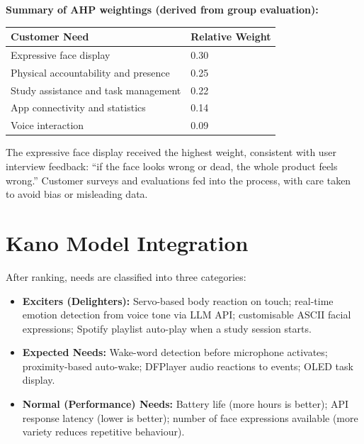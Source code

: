 \documentclass[12pt,a4paper]{article}
\begin{document}
\textbf{Summary of AHP weightings (derived from group evaluation):}

\begin{center}
\begin{tabular}{|L{0.45\textwidth}|L{0.20\textwidth}|}
\hline
\textbf{Customer Need} & \textbf{Relative Weight} \\ \hline
Expressive face display & 0.30 \\ \hline
Physical accountability and presence & 0.25 \\ \hline
Study assistance and task management & 0.22 \\ \hline
App connectivity and statistics & 0.14 \\ \hline
Voice interaction & 0.09 \\ \hline
\end{tabular}
\end{center}

The expressive face display received the highest weight, consistent with user interview
feedback: ``if the face looks wrong or dead, the whole product feels wrong.''
Customer surveys and evaluations fed into the process, with care taken to avoid bias
or misleading data.

\section*{Kano Model Integration}

After ranking, needs are classified into three categories:

\begin{itemize}[leftmargin=*]
\item \textbf{Exciters (Delighters):} Servo-based body reaction on touch;
      real-time emotion detection from voice tone via LLM API; customisable
      ASCII facial expressions; Spotify playlist auto-play when a study
      session starts.
\item \textbf{Expected Needs:} Wake-word detection before microphone activates;
      proximity-based auto-wake; DFPlayer audio reactions to events;
      OLED task display.
\item \textbf{Normal (Performance) Needs:} Battery life (more hours is better);
      API response latency (lower is better); number of face expressions
      available (more variety reduces repetitive behaviour).
\end{itemize}
\end{document}
